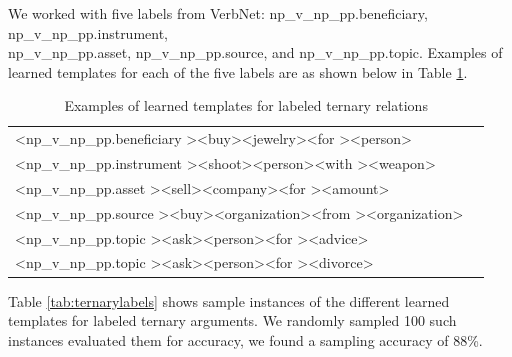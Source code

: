 We worked with five labels from VerbNet: 
np\_v\_np\_pp.beneficiary, np\_v\_np\_pp.instrument,\\ np\_v\_np\_pp.asset,
 np\_v\_np\_pp.source, and  np\_v\_np\_pp.topic. 
 Examples of learned templates for each of the five labels are as shown below in Table \ref{tab:ternarylabelsTemplates}.
 \begin{table}[h]
 \centering
     \begin{tabular}{ll}
       \hline
       
\textless np\_v\_np\_pp.beneficiary \textgreater \textless buy\textgreater \textless jewelry\textgreater \textless for \textgreater  \textless person\textgreater \\
 
\textless np\_v\_np\_pp.instrument \textgreater \textless shoot\textgreater \textless person\textgreater \textless with \textgreater \textless weapon\textgreater \\

\textless np\_v\_np\_pp.asset \textgreater \textless sell\textgreater \textless company\textgreater \textless for \textgreater \textless amount\textgreater \\

\textless np\_v\_np\_pp.source \textgreater \textless buy\textgreater \textless organization\textgreater \textless from \textgreater \textless organization\textgreater \\

\textless np\_v\_np\_pp.topic \textgreater \textless ask\textgreater \textless person\textgreater \textless for \textgreater \textless advice\textgreater \\
  
  \textless np\_v\_np\_pp.topic \textgreater \textless ask\textgreater \textless person\textgreater \textless for \textgreater \textless divorce\textgreater \\
            \hline
     \end{tabular}
     \caption{Examples of learned templates for labeled ternary relations}
       \label{tab:ternarylabelsTemplates}
     \end{table}
     
Table \ref{tab:ternarylabels}  shows sample instances of the different learned  templates for labeled ternary arguments.
We randomly sampled 100 such instances evaluated them for accuracy, we found a sampling accuracy of 88\%.


